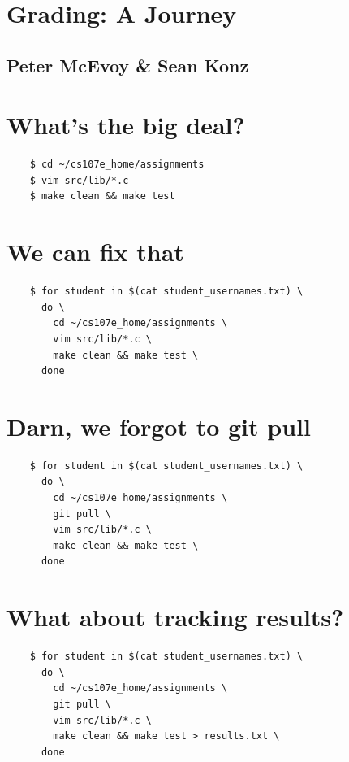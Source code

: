 \documentclass{article}
\begin{document}
\section*{Grading: A Journey}
\subsection*{Peter McEvoy \& Sean Konz}

\newpage

\section*{What's the big deal?}
\vspace{2ex}
\begin{verbatim}
    $ cd ~/cs107e_home/assignments
    $ vim src/lib/*.c
    $ make clean && make test
\end{verbatim}

\newpage

\section*{We can fix that}
\vspace{2ex}
\begin{verbatim}
    $ for student in $(cat student_usernames.txt) \
      do \
        cd ~/cs107e_home/assignments \
        vim src/lib/*.c \
        make clean && make test \
      done
\end{verbatim}

\newpage

\section*{Darn, we forgot to git pull}
\vspace{2ex}
\begin{verbatim}
    $ for student in $(cat student_usernames.txt) \
      do \
        cd ~/cs107e_home/assignments \
        git pull \
        vim src/lib/*.c \
        make clean && make test \
      done
\end{verbatim}

\newpage

\section*{What about tracking results?}
\vspace{2ex}
\begin{verbatim}
    $ for student in $(cat student_usernames.txt) \
      do \
        cd ~/cs107e_home/assignments \
        git pull \
        vim src/lib/*.c \
        make clean && make test > results.txt \
      done
\end{verbatim}
\end{document}
